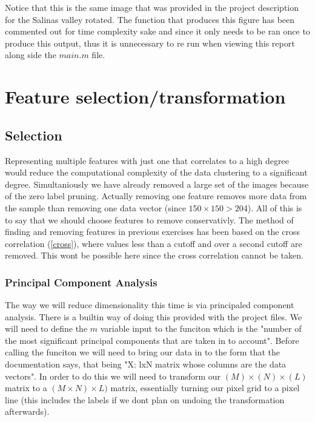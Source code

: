 \documentclass[12pt, a4paper]{article}
\begin{document}
Notice that this is the same image that was provided in the project description for the Salinas valley rotated. The function that produces this figure has been commented out for time complexity sake and since it only needs to be ran once to produce this output, thus it is unnecessary to re run when viewing this report along side the $main.m$ file.

\section{Feature selection/transformation}

\subsection{Selection}

Representing multiple features with just one that correlates to a high degree would reduce the computational complexity of the data clustering to a significant degree. Simultaniously we have already removed a large set of the images because of the zero label pruning. Actually removing one feature removes more data from the sample than removing one data vector (since $150\times150>204$). All of this is to say that we should choose features to remove conservativly. The method of finding and removing features in previous exercises has been based on the cross correlation (\ref{cross}), where values less than a cutoff and over a second cutoff are removed. This wont be possible here since the cross correlation cannot be taken.
\newline

\subsubsection{Principal Component Analysis}

The way we will reduce dimensionality this time is via principaled component analysis. There is a builtin way of doing this provided with the project files. We will need to define the $m$ variable input to the funciton which is the "number of the most significant principal components that are taken in to account". Before calling the funciton we will need to bring our data in to the form that the documentation says, that being "X: lxN matrix whose columns are the data vectors". In order to do this we will need to transform our $(M)\times (N)\times (L)$ matrix to a $(M\times N) \times L)$ matrix, essentially turning our pixel grid to a pixel line (this includes the labels if we dont plan on undoing the transformation afterwards).
\newline
\end{document}
